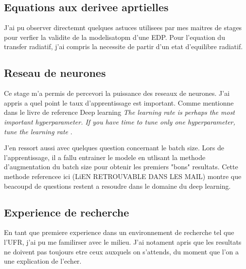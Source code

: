 \subsection{Equations aux derivee aprtielles}
J'ai pu observer directemnt quelques astuces utilisees par mes maitres de stages pour verfier la validite de la modelisatopm d'une EDP. Pour l'equation du transfer radiatif, j'ai compris la necessite de partir d'un etat d'equilibre radiatif.

\subsection{Reseau de neurones}
Ce stage m'a permis de percevori la puissance des reseaux de neurones. J'ai appris a quel point le taux d'apprentissage est important. Comme mentionne dans le livre de reference Deep learning \textit{The learning rate is perhaps the most important hyperparameter. If you have time to tune only one hyperparameter, tune the learning rate} \parencite[417]{Reference5}. 

J'en ressort aussi avec quelques question concernant le batch size. Lors de l'apprentissage, il a fallu entrainer le modele en utlisant la methode d'augmentation du batch size pour obtenir les premiers "bons" resultats. Cette methode referencee ici (LiEN RETROUVABLE DANS LES MAIL) montre que beacoupd de questions restent a resoudre dans le domaine du deep learning.

\subsection{Experience de recherche}
En tant que premiere experience dans un environnement de recherche tel que l'UFR, j'ai pu me familirser avec le milieu. J'ai notament apris que les resultats ne doivent pas toujours etre ceux auxquels on s'attends, du moment que l'on a une explication de l'echer.


